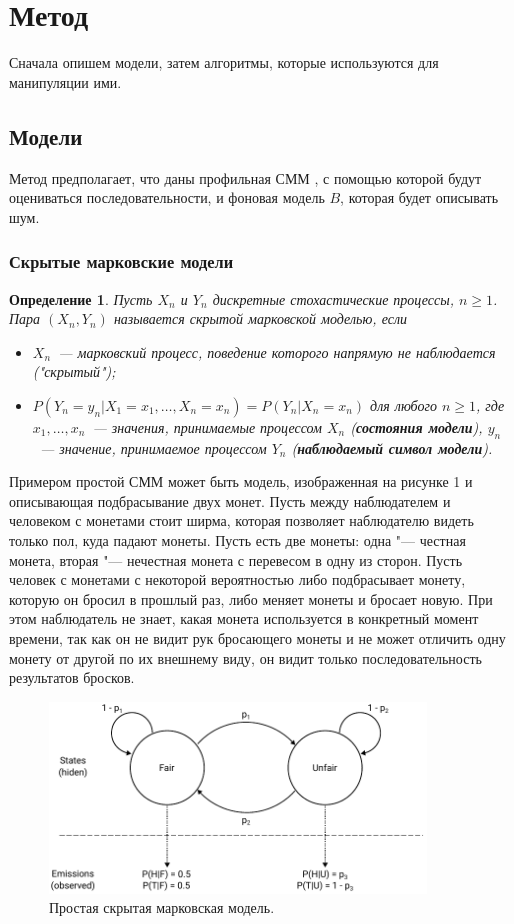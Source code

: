 \documentclass[specialist,
substylefile = spbu_report.rtx,
subf,href,colorlinks=true, 12pt]{disser}
\newtheorem{defenition}{Определение}
\begin{document}
		\section{Метод}
		Сначала опишем модели, затем алгоритмы, которые используются для манипуляции ими.
		\subsection{Модели}
		Метод предполагает, что даны профильная СММ \cite{Compeau2015a}, с помощью которой будут оцениваться последовательности, и фоновая модель $B$, которая будет описывать шум.
		\subsubsection{Скрытые марковские модели}						
			\begin{defenition}
				Пусть $X_{n}$ и $Y_{n}$ дискретные стохастические процессы, $n \geq 1$. Пара $(X_{n}, Y_{n})$ называется скрытой марковской моделью, если
				\begin{itemize}
					\item $X_{n}$~--- марковский процесс, поведение которого напрямую не наблюдается ("скрытый");
					\item $P(Y_{n} = y_{n}|X_{1} = x_{1},\dots, X_{n} = x_{n}) = P(Y_{n}|X_{n}=x_{n})$ для любого $n \geq 1$, где $x_{1},\dots,x_{n}$~--- значения, принимаемые процессом  $X_{n}$ (\textbf{состояния модели}), $ y_{n}$~--- значение, принимаемое процессом $Y_{n}$ (\textbf{наблюдаемый символ модели}).
				\end{itemize}
			\end{defenition}
		
			Примером простой СММ может быть модель, изображенная на рисунке 1 и описывающая подбрасывание двух монет. Пусть между наблюдателем и человеком с монетами стоит ширма, которая позволяет наблюдателю видеть только пол, куда падают монеты. Пусть есть две монеты: одна "--- честная монета, вторая "--- нечестная монета с перевесом в одну из сторон. Пусть человек с монетами с некоторой вероятностью либо подбрасывает монету, которую он бросил в прошлый раз, либо меняет монеты и бросает новую. При этом наблюдатель не знает, какая монета используется в конкретный момент времени, так как он не видит рук бросающего монеты и не может отличить одну монету от другой по их внешнему виду, он видит только последовательность результатов бросков.
			
			\begin{figure}[h]
				\includegraphics[width=10cm]{figure1}
				\centering
				\caption{Простая скрытая марковская модель.}
			\end{figure}
		
\end{document}
